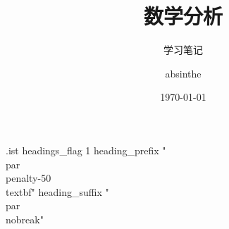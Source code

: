 \begin{filecontents}[force]{\jobname.ist}
headings_flag 1
heading_prefix "\\par\\penalty-50\\textbf{"
heading_suffix "}\\par\\nobreak"
\end{filecontents}
\documentclass[cn,hang,blue,chinese,fancy,twocol,biber]{elegantbook}

\title{数学分析}
\subtitle{学习笔记}

\author{absinthe}
\date{\today}




\usepackage{float}%
\renewcommand\topfraction{.9}
\renewcommand\textfraction{0.35}
\renewcommand\floatpagefraction{0.8}
\setlength\columnseprule{0.01pt} %
\setcounter{tocdepth}{3}

\makeindex[options={-s \jobname.ist}]
\usepackage{hyperref}
\makeindex
\usepackage{amssymb}
\newcommand\bbR{\mathbb{R}}


\makeatletter {} \makeatother 


\maketitle
	
\tableofcontents
\mainmatter
\chapter{序列极限}
\section{实数系连续性的基本定理}
\subsection{戴德金分割定理}
\begin{theorem}{戴德金分割定理}\index{戴德金分割定理}
	对 $\bbR$ 的任一分划 $(A|B)$ , $B$ 中必有最小数.	
\end{theorem}
	
